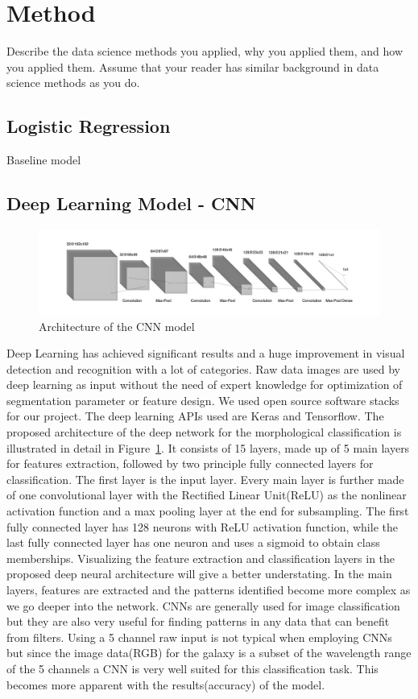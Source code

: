 \section{Method}
\label{sec:method}
Describe the data science methods you applied, why you applied them, and how you applied them. Assume that your reader has similar background in data science methods as you do.

\subsection{Logistic Regression}
Baseline model

\subsection{Deep Learning Model - CNN}

\begin{figure}[h]
	\centering
	\captionsetup{justification=centering}
	\includegraphics[width=\columnwidth]{Figures/CNNArchitecture.jpg}
	\caption{Architecture of the CNN model}
	\label{fig:cnnarch}
\end{figure}

Deep Learning has achieved significant results and a huge improvement in visual detection and recognition with a lot of categories. Raw data images are used by deep learning as input without the need of expert knowledge for optimization of segmentation parameter or feature design. We used open source software stacks for our project. The deep learning APIs used are Keras and Tensorflow. The proposed architecture of the deep network for the morphological classification is illustrated in detail in Figure~\ref{fig:cnnarch}. It consists of 15 layers, made up of 5 main layers for features extraction, followed by two principle fully connected layers for classification. The first layer is the input layer. Every main layer is further made of one convolutional layer with the Rectified Linear Unit(ReLU) as the nonlinear activation function and a max pooling layer at the end for subsampling. The first fully connected layer has 128 neurons with ReLU activation function, while the last fully connected layer has one neuron and uses a sigmoid to obtain class memberships. Visualizing the feature extraction and classification layers in the proposed deep neural architecture will give a better understating. In the main layers, features are extracted and the patterns identified become more complex as we go deeper into the network. CNNs are generally used for image classification but they are also very useful for finding patterns in any data that can benefit from filters. Using a 5 channel raw input is not typical when employing CNNs but since the image data(RGB) for the galaxy is a subset of the wavelength range of the 5 channels a CNN is very well suited for this classification task. This becomes more apparent with the results(accuracy) of the model.